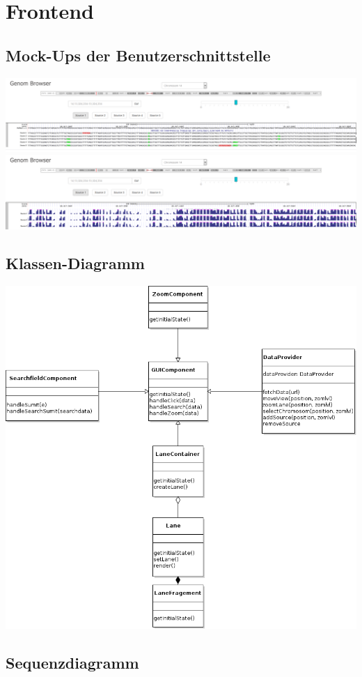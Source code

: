 \section{Frontend}
\subsection{Mock-Ups der Benutzerschnittstelle}
\includegraphics[width=\textwidth]{gui/gb_mockup_detail_view.png}
\includegraphics[width=\textwidth]{gui/gb_mockup_index_view.png}
\subsection{Klassen-Diagramm}
\includegraphics[width=\textwidth]{gui/gui-klassendiagramm.png}
\subsection{Sequenzdiagramm}
